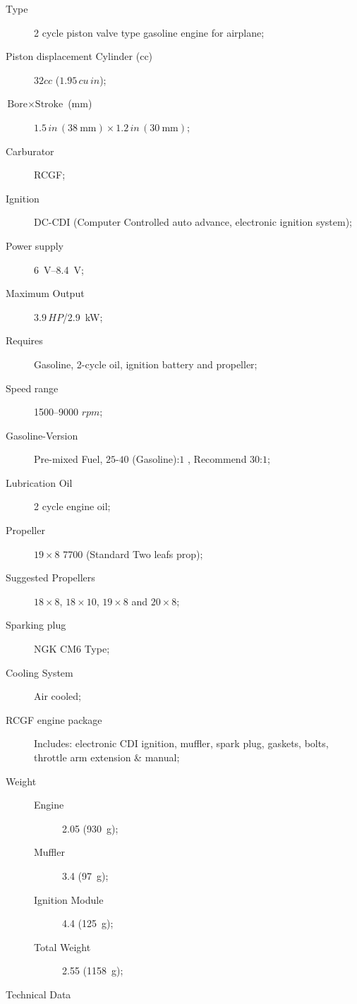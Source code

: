 \documentclass[english,fira]{ist-report}
\begin{document}
\begin{description}
    \item [Type] 2 cycle piston valve type gasoline engine for airplane;
    \item [Piston displacement Cylinder (cc)] $32cc$ ($1.95\,cu\,in$);
    \item [$\text{Bore}\times\text{Stroke}$ (\si{\milli\meter})] $1.5\,in\,(\SI{38}{\milli\meter})\times1.2\,in\,(\SI{30}{\milli\meter})$;
    \item [Carburator] RCGF;
    \item [Ignition] DC-CDI (Computer Controlled auto advance, electronic ignition system);
    \item [Power supply] \SIrange{6}{8.4}{\volt};
    \item [Maximum Output] $3.9\,HP$/\SI{2.9}{\kilo\watt};
    \item [Requires] Gasoline, 2-cycle oil, ignition battery and propeller;
    \item [Speed range] \numrange{1500}{9000} $rpm$;
    \item [Gasoline-Version] Pre-mixed Fuel, $25$-$40$ (Gasoline):$1$ , Recommend $30$:$1$;
    \item [Lubrication Oil] 2 cycle engine oil;
    \item [Propeller] $19\times8$ \SI{7700}{\rpm} (Standard Two leafs prop);
    \item [Suggested Propellers] $18\times8$, $18\times10$, $19\times8$ and $20\times8$;
    \item [Sparking plug] NGK CM6 Type;
    \item [Cooling System] Air cooled;
    \item [RCGF engine package] Includes: electronic CDI ignition, muffler, spark plug, gaskets, bolts, throttle arm extension \& manual;
    \item [Weight]
    \begin{description}
        \item []
        \item [Engine] \SI{2.05}{\pound} (\SI{930}{\gram});
        \item [Muffler] \SI{3.4}{\ounce} (\SI{97}{\gram});
        \item [Ignition Module] \SI{4.4}{\ounce} (\SI{125}{\gram});
        \item [Total Weight] \SI{2.55}{\pound} (\SI{1158}{\gram});
    \end{description}
    \item [Technical Data]
    \begin{description}

\end{description}
\end{description}
\end{document}
